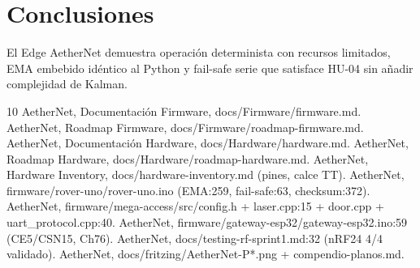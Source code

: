 \documentclass[conference]{IEEEtran}
\begin{document}
\section{Conclusiones}
El Edge AetherNet demuestra operación determinista con recursos limitados, EMA embebido idéntico al Python y fail-safe serie que satisface HU-04 sin añadir complejidad de Kalman.

\begin{thebibliography}{10}
 AetherNet, Documentación Firmware, docs/Firmware/firmware.md.
 AetherNet, Roadmap Firmware, docs/Firmware/roadmap-firmware.md.
 AetherNet, Documentación Hardware, docs/Hardware/hardware.md.
 AetherNet, Roadmap Hardware, docs/Hardware/roadmap-hardware.md.
 AetherNet, Hardware Inventory, docs/hardware-inventory.md (pines, calce TT).
 AetherNet, firmware/rover-uno/rover-uno.ino (EMA:259, fail-safe:63, checksum:372).
 AetherNet, firmware/mega-access/src/config.h + laser.cpp:15 + door.cpp + uart\_protocol.cpp:40.
 AetherNet, firmware/gateway-esp32/gateway-esp32.ino:59 (CE5/CSN15, Ch76).
 AetherNet, docs/testing-rf-sprint1.md:32 (nRF24 4/4 validado).
 AetherNet, docs/fritzing/AetherNet-P*.png + compendio-planos.md.
\end{thebibliography}
\end{document}
